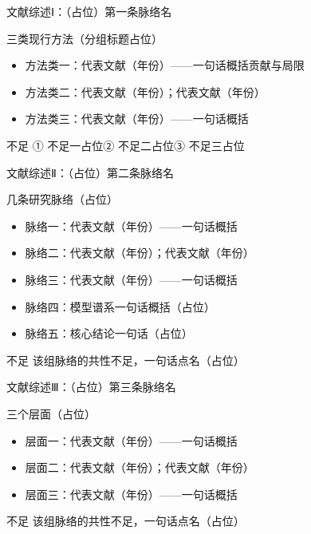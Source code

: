 \documentclass[aspectratio=169,11pt]{beamer}
\begin{document}
\begin{frame}{文献综述Ⅰ：（占位）第一条脉络名}
  \footnotesize
  \begin{point}{三类现行方法（分组标题占位）}
    \begin{itemize}
      \item \textcolor{primary}{方法类一}：代表文献（年份）——一句话概括贡献与局限
      \item \textcolor{primary}{方法类二}：代表文献（年份）；代表文献（年份）
      \item \textcolor{primary}{方法类三}：代表文献（年份）——一句话概括
    \end{itemize}
  \end{point}
  \begin{warn}{不足}
    ① 不足一占位\quad ② 不足二占位\quad ③ 不足三占位
  \end{warn}
\end{frame}

\begin{frame}{文献综述Ⅱ：（占位）第二条脉络名}
  \footnotesize
  \begin{point}{几条研究脉络（占位）}
    \begin{itemize}
      \item \textcolor{primary}{脉络一}：代表文献（年份）——一句话概括
      \item \textcolor{primary}{脉络二}：代表文献（年份）；代表文献（年份）
      \item \textcolor{primary}{脉络三}：代表文献（年份）——一句话概括
      \item \textcolor{primary}{脉络四}：模型谱系一句话概括（占位）
      \item \textcolor{primary}{脉络五}：核心结论一句话（占位）
    \end{itemize}
  \end{point}
  \begin{warn}{不足}
    该组脉络的共性不足，一句话点名（占位）
  \end{warn}
\end{frame}

\begin{frame}{文献综述Ⅲ：（占位）第三条脉络名}
  \footnotesize
  \begin{point}{三个层面（占位）}
    \begin{itemize}
      \item \textcolor{primary}{层面一}：代表文献（年份）——一句话概括
      \item \textcolor{primary}{层面二}：代表文献（年份）；代表文献（年份）
      \item \textcolor{primary}{层面三}：代表文献（年份）——一句话概括
    \end{itemize}
  \end{point}
  \begin{warn}{不足}
    该组脉络的共性不足，一句话点名（占位）
  \end{warn}
\end{frame}
\end{document}
